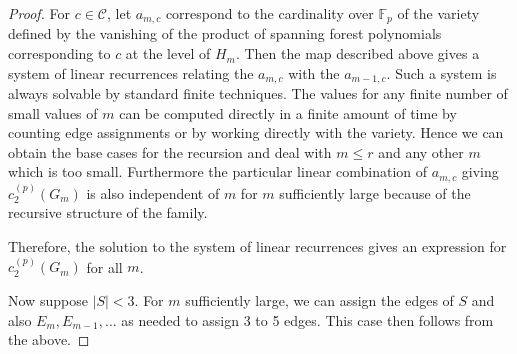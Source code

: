 \documentclass[12pt]{amsart}
\numberwithin{definition}{section}
\begin{document}
\begin{proof}
For $c\in \mathcal{C}$, let $a_{m,c}$ correspond to the cardinality over $\mathbb{F}_p$ of the variety defined by the vanishing of the product of spanning forest polynomials corresponding to $c$ at the level of $H_m$.  Then the map described above gives a system of linear recurrences relating the $a_{m,c}$ with the $a_{m-1, c}$.  Such a system is always solvable by standard finite techniques.
The values for any finite number of small values of $m$ can be computed directly in a finite amount of time by counting edge assignments or by working directly with the variety.  Hence we can obtain the base cases for the recursion and deal with $m\leq r$ and any other $m$ which is too small.
Furthermore the particular linear combination of $a_{m,c}$ giving $c_2^{(p)}(G_m)$ is also independent of $m$ for $m$ sufficiently large because of the recursive structure of the family.

Therefore, the solution to the system of linear recurrences gives an expression for $c_2^{(p)}(G_m)$ for all $m$.

Now suppose $|S|<3$. For $m$ sufficiently large, we can assign the edges of $S$ and also $E_m,E_{m-1},\dots$ as needed to assign 3 to 5 edges. This case then follows from the above. 


  


\end{proof}
\end{document}
